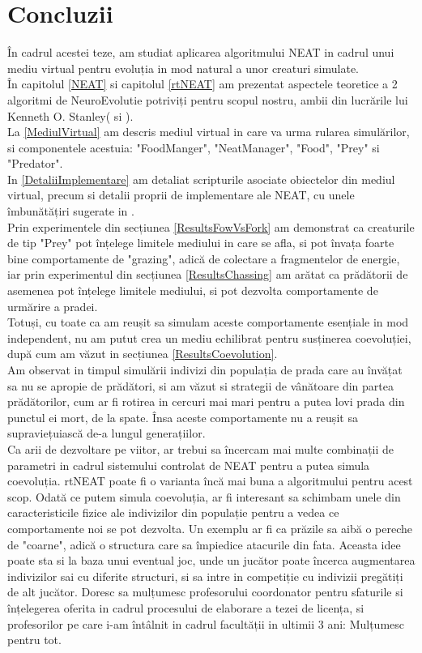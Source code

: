 \chapter*{Concluzii} 
În cadrul acestei teze, am studiat aplicarea algoritmului NEAT in cadrul unui mediu virtual pentru evoluția in mod natural a unor creaturi simulate.\\
În capitolul \ref{NEAT} si capitolul \ref{rtNEAT} am prezentat aspectele teoretice a 2 algoritmi de NeuroEvolutie potriviți pentru scopul nostru, ambii din lucrările lui Kenneth O. Stanley(\cite{NEAT} si \cite{rtNEAT}).\\
La \ref{MediulVirtual} am descris mediul virtual in care va urma rularea simulărilor, si componentele acestuia: "FoodManger", "NeatManager", "Food", "Prey" si "Predator".\\
In \ref{DetaliiImplementare} am detaliat scripturile asociate obiectelor din mediul virtual, precum si detalii proprii de implementare ale NEAT, cu unele îmbunătățiri sugerate in \cite{NeatFAQ}.\\
Prin experimentele din secțiunea \ref{ResultsFowVsFork} am demonstrat ca creaturile de tip "Prey" pot înțelege limitele mediului in care se afla, si pot învața foarte bine comportamente de "grazing", adică de colectare a fragmentelor de energie,
iar prin experimentul din secțiunea \ref{ResultsChassing} am arătat ca prădătorii de asemenea pot înțelege limitele mediului, si pot dezvolta comportamente de urmărire a pradei.\\
Totuși, cu toate ca am reușit sa simulam aceste comportamente esențiale in mod independent, nu am putut crea un mediu echilibrat pentru susținerea coevoluției, după cum am văzut in secțiunea \ref{ResultsCoevolution}.\\
Am observat in timpul simulării indivizi din populația de prada care au învățat sa nu se apropie de prădători, si am văzut si strategii de vânătoare din partea prădătorilor, cum ar fi rotirea in cercuri mai mari pentru a putea lovi prada din punctul ei mort, de la spate.
Însa aceste comportamente nu a reușit sa supraviețuiască de-a lungul generațiilor.\\
Ca arii de dezvoltare pe viitor, ar trebui sa încercam mai multe combinații de parametri in cadrul sistemului controlat de NEAT pentru a putea simula coevoluția. rtNEAT poate fi o varianta încă mai buna a algoritmului pentru acest scop.
Odată ce putem simula coevoluția, ar fi interesant sa schimbam unele din caracteristicile fizice ale indivizilor din populație pentru a vedea ce comportamente noi se pot dezvolta. 
Un exemplu ar fi ca prăzile sa aibă o pereche de "coarne", adică o structura care sa împiedice atacurile din fata. Aceasta idee poate sta si la baza unui eventual joc, unde un jucător poate încerca augmentarea indivizilor sai cu diferite structuri, si sa intre in competiție cu indivizii pregătiți de alt jucător.
Doresc sa mulțumesc profesorului coordonator pentru sfaturile si înțelegerea oferita in cadrul procesului de elaborare a tezei de licența, si profesorilor pe care i-am întâlnit in cadrul facultății in ultimii 3 ani: Mulțumesc pentru tot.
